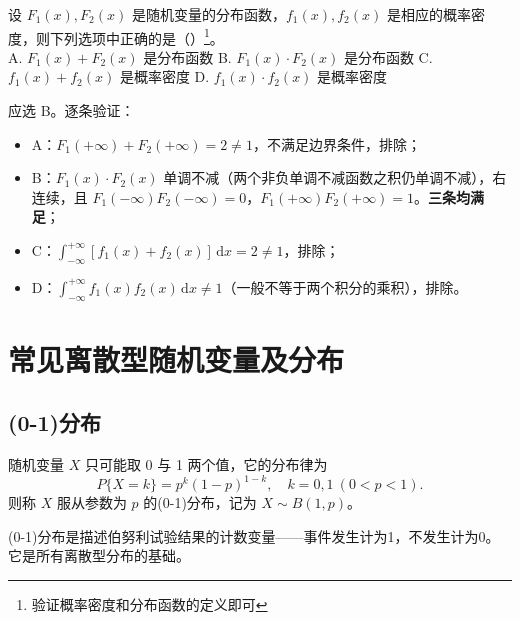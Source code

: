 \documentclass[lang=cn,11pt]{elegantbook}
\begin{document}
\begin{exercise}\label{exer:2-8}
设 $F_1(x), F_2(x)$ 是随机变量的分布函数，$f_1(x), f_2(x)$ 是相应的概率密度，则下列选项中正确的是（\quad）\footnote{验证概率密度和分布函数的定义即可}。\\
A. $F_1(x) + F_2(x)$ 是分布函数\quad
B. $F_1(x) \cdot F_2(x)$ 是分布函数\quad
C. $f_1(x) + f_2(x)$ 是概率密度\quad
D. $f_1(x) \cdot f_2(x)$ 是概率密度
\end{exercise}
\begin{solution}
应选 B。逐条验证：
\begin{itemize}
    \item A：$F_1(+\infty) + F_2(+\infty) = 2 \neq 1$，不满足边界条件，排除；
    \item B：$F_1(x) \cdot F_2(x)$ 单调不减（两个非负单调不减函数之积仍单调不减），右连续，且 $F_1(-\infty)F_2(-\infty) = 0$，$F_1(+\infty)F_2(+\infty) = 1$。\textbf{三条均满足}；
    \item C：$\displaystyle\int_{-\infty}^{+\infty}[f_1(x) + f_2(x)]\,\mathrm{d}x = 2 \neq 1$，排除；
    \item D：$\displaystyle\int_{-\infty}^{+\infty} f_1(x)f_2(x)\,\mathrm{d}x \neq 1$（一般不等于两个积分的乘积），排除。
\end{itemize}
\end{solution}


\section{常见离散型随机变量及分布}

\subsection{(0-1)分布} \label{subsec:0-1-dist}
\begin{definition}[(0-1)分布]\label{def:0-1-dist}
随机变量 $X$ 只可能取 0 与 1 两个值，它的分布律为
\[
P\{X = k\} = p^k (1-p)^{1-k},\quad k=0,1\ (0 < p < 1).
\]
则称 $X$ 服从参数为 $p$ 的(0-1)分布，记为 $X \sim B(1,p)$。
\end{definition}

\begin{note}
(0-1)分布是描述伯努利试验结果的计数变量——事件发生计为1，不发生计为0。它是所有离散型分布的基础。
\end{note}
\end{document}
